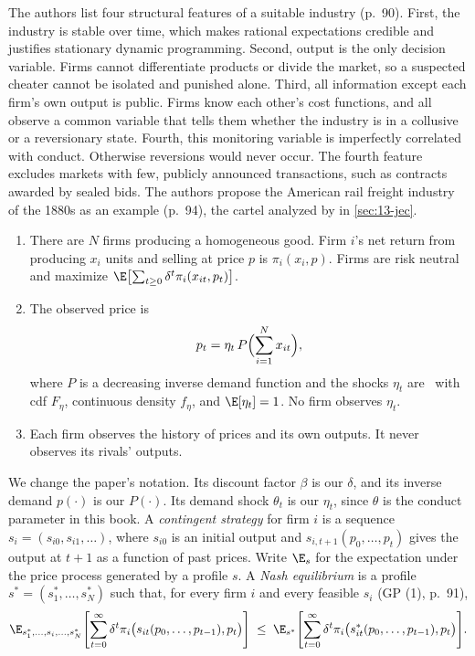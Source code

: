 The authors list four structural features of a suitable industry (p.~90). First, the industry is stable over time,
which makes rational expectations credible and justifies stationary dynamic programming. Second, output is the only
decision variable. Firms cannot differentiate products or divide the market, so a suspected cheater cannot be
isolated and punished alone. Third, all information except each firm's own output is public. Firms know each other's
cost functions, and all observe a common variable that tells them whether the industry is in a collusive or a
reversionary state. Fourth, this monitoring variable is imperfectly correlated with conduct. Otherwise reversions
would never occur. The fourth feature excludes markets with few, publicly announced transactions, such as contracts
awarded by sealed bids. The authors propose the American rail freight industry of the 1880s as an example
(p.~94), the cartel analyzed by \citet{Porter1983} in \cref{sec:13-jec}.

\begin{assumption}\label{asm:12-gp}
\leavevmode
\begin{enumerate}[label=(\roman*)]
\item There are $N$ firms producing a homogeneous good. Firm $i$'s net return from producing $x_i$ units and selling
at price $p$ is $\pi_i(x_i, p)$. Firms are risk neutral and maximize $\E\bigl[\sum_{t \ge 0}\delta^t\pi_i(x_{it}, p_t)\bigr]$.
\item The observed price is
\begin{equation}\label{eq:12-gp-price}
p_t = \eta_t\,P\Bigl(\sum_{i=1}^N x_{it}\Bigr),
\end{equation}
where $P$ is a decreasing inverse demand function and the shocks $\eta_t$ are \iid\ with cdf $F_\eta$, continuous
density $f_\eta$, and $\E[\eta_t] = 1$. No firm observes $\eta_t$.
\item Each firm observes the history of prices and its own outputs. It never observes its rivals' outputs.
\end{enumerate}
\end{assumption}

We change the paper's notation. Its discount factor $\beta$ is our $\delta$, and its inverse demand $p(\cdot)$ is our
$P(\cdot)$. Its demand shock $\theta_t$ is our $\eta_t$, since $\theta$ is the conduct parameter in this book. A
\emph{contingent strategy} for firm $i$ is a sequence $s_i = (s_{i0}, s_{i1}, \dots)$, where $s_{i0}$ is an initial
output and $s_{i,t+1}(p_0, \dots, p_t)$ gives the output at $t + 1$ as a function of past prices. Write $\E_{s}$ for
the expectation under the price process generated by a profile $s$. A \emph{Nash equilibrium} is a profile
$s^* = (s_1^*, \dots, s_N^*)$ such that, for every firm $i$ and every feasible $s_i$ (GP (1), p.~91),
\begin{equation}\label{eq:12-gp-nash}
\E_{s_1^*, \dots, s_i, \dots, s_N^*}\Biggl[\sum_{t = 0}^{\infty}\delta^t\pi_i\bigl(s_{it}(p_0, \dots, p_{t-1}), p_t\bigr)\Biggr]
\;\le\;
\E_{s^*}\Biggl[\sum_{t = 0}^{\infty}\delta^t\pi_i\bigl(s_{it}^*(p_0, \dots, p_{t-1}), p_t\bigr)\Biggr].
\end{equation}

